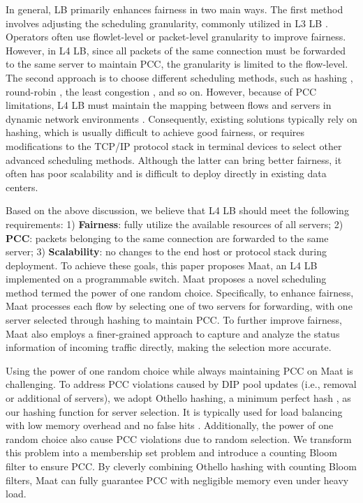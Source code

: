 In general, LB primarily enhances fairness in two main ways. The first method involves adjusting the scheduling granularity, commonly utilized in L3 LB \cite{aghdai2020spotlight}. Operators often use flowlet-level \cite{alizadeh2014conga, katta2016hula, liu2023burstbalancer} or packet-level \cite{perry2014fastpass} granularity to improve fairness. However, in L4 LB, since all packets of the same connection must be forwarded to the same server to maintain PCC, the granularity is limited to the flow-level. The second approach is to choose different scheduling methods, such as hashing \cite{miao2017silkroad, gandhi2014duet}, round-robin \cite{katta2016clove, he2015presto}, the least congestion \cite{alizadeh2014conga, curtis2011mahout}, and so on. However, because of PCC limitations, L4 LB must maintain the mapping between flows and servers in dynamic network environments \cite{araujo2018balancing}.
Consequently, existing solutions typically rely on hashing, which is usually difficult to achieve good fairness, or requires modifications to the TCP/IP protocol stack in terminal devices to select other advanced scheduling methods. Although the latter can bring better fairness, it often has poor scalability and is difficult to deploy directly in existing data centers.

Based on the above discussion, we believe that L4 LB should meet the following requirements: 1) \textbf{Fairness}: fully utilize the available resources of all servers; 2) \textbf{PCC}: packets belonging to the same connection are forwarded to the same server; 3) \textbf{Scalability}: no changes to the end host or protocol stack during deployment. To achieve these goals, this paper proposes Maat, an L4 LB implemented on a programmable switch. Maat proposes a novel scheduling method termed the power of one random choice. Specifically, to enhance fairness, Maat processes each flow by selecting one of two servers for forwarding, with one server selected through hashing to maintain PCC. To further improve fairness, Maat also employs a finer-grained approach to capture and analyze the status information of incoming traffic directly, making the selection more accurate.

Using the power of one random choice while always maintaining PCC on Maat is challenging. To address PCC violations caused by DIP pool updates (i.e., removal or additional of servers), we adopt Othello hashing, a minimum perfect hash \cite{majewski1996family}, as our hashing function for server selection. It is typically used for load balancing with low memory overhead and no false hits \cite{yu2018memory}. Additionally, the power of one random choice also cause PCC violations due to random selection. We transform this problem into a membership set problem and introduce a counting Bloom filter\cite{bonomi2006improved} to ensure PCC. By cleverly combining Othello hashing with counting Bloom filters, Maat can fully guarantee PCC with negligible memory even under heavy load.


